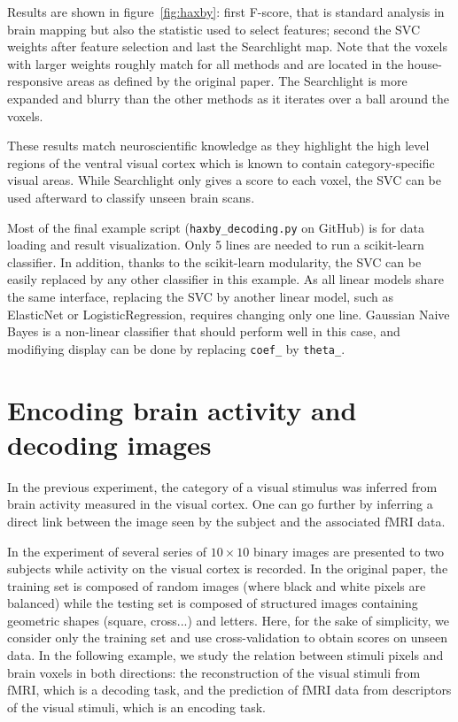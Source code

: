 \documentclass{frontiersSCNS} %
\begin{document}
Results are shown in figure~\ref{fig:haxby}: first
F-score, that is standard analysis in brain mapping but also the
statistic used to select features; second the SVC weights after feature
selection and last the Searchlight map.
%
Note that the voxels with larger weights roughly match for all methods and
are located in the house-responsive areas as defined by the original paper.
%
The Searchlight is more expanded and blurry than the other methods
as it iterates over a ball around the voxels.

These results match neuroscientific knowledge as they highlight the
high level regions of the ventral visual cortex which is known to
contain category-specific visual areas. While Searchlight only gives a
score to each voxel, the SVC can be used afterward to classify unseen
brain scans.

Most of the final example script (\texttt{haxby\_decoding.py} on GitHub) is
for data
loading and result visualization. Only 5 lines are needed to run a scikit-learn
classifier. In addition, thanks to the scikit-learn modularity, the SVC can be easily
replaced by any other classifier in this example. As all linear models share the
same interface, replacing the SVC by another linear model, such as ElasticNet
or LogisticRegression, requires changing only one line. Gaussian Naive Bayes is a non-linear
classifier that should perform well in this case, and modifiying display can be
done by replacing \texttt{coef\_} by \texttt{theta\_}.


\section{Encoding brain activity and decoding images}
\label{kamitani}

In the previous experiment, the category of a visual stimulus was inferred from
brain activity measured in the visual cortex.
One can go further by inferring a direct link between the image
seen by the subject and the associated fMRI data.

In the experiment of \cite{miyawaki2008} several series of $10{\times}10$
binary images are presented to two subjects while activity on the visual cortex
is recorded.
In the original paper, the training set is composed of random images (where black and white pixels
are balanced) while the testing set is composed of structured images containing
geometric shapes (square, cross...) and letters. Here, for the sake of simplicity, we consider only the training set and use cross-validation to
obtain scores on unseen data.
%
In the following example, we study the relation between stimuli pixels and
brain voxels in both directions: the reconstruction of the visual stimuli
from fMRI, which is a decoding task, and the prediction of fMRI data
from descriptors of the visual stimuli, which is an encoding task.
\end{document}
